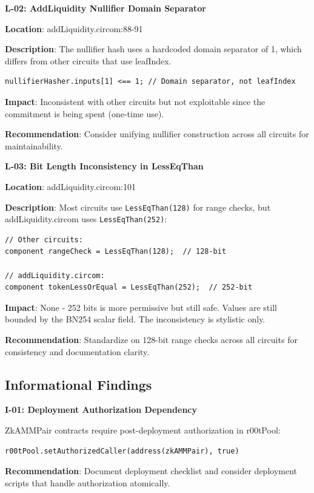 \documentclass[11pt,a4paper]{article}
\begin{document}
\begin{lowseverity}
\textbf{L-02: AddLiquidity Nullifier Domain Separator}

\textbf{Location}: addLiquidity.circom:88-91

\textbf{Description}: The nullifier hash uses a hardcoded domain separator of 1, which differs from other circuits that use leafIndex.

\begin{lstlisting}[style=circom]
nullifierHasher.inputs[1] <== 1; // Domain separator, not leafIndex
\end{lstlisting}

\textbf{Impact}: Inconsistent with other circuits but not exploitable since the commitment is being spent (one-time use).

\textbf{Recommendation}: Consider unifying nullifier construction across all circuits for maintainability.
\end{lowseverity}

\begin{lowseverity}
\textbf{L-03: Bit Length Inconsistency in LessEqThan}

\textbf{Location}: addLiquidity.circom:101

\textbf{Description}: Most circuits use \texttt{LessEqThan(128)} for range checks, but addLiquidity.circom uses \texttt{LessEqThan(252)}:

\begin{lstlisting}[style=circom]
// Other circuits:
component rangeCheck = LessEqThan(128);  // 128-bit

// addLiquidity.circom:
component tokenLessOrEqual = LessEqThan(252);  // 252-bit
\end{lstlisting}

\textbf{Impact}: None - 252 bits is more permissive but still safe. Values are still bounded by the BN254 scalar field. The inconsistency is stylistic only.

\textbf{Recommendation}: Standardize on 128-bit range checks across all circuits for consistency and documentation clarity.
\end{lowseverity}

\subsection{Informational Findings}

\begin{infobox}
\textbf{I-01: Deployment Authorization Dependency}

ZkAMMPair contracts require post-deployment authorization in r00tPool:
\begin{lstlisting}[style=solidity]
r00tPool.setAuthorizedCaller(address(zkAMMPair), true)
\end{lstlisting}

\textbf{Recommendation}: Document deployment checklist and consider deployment scripts that handle authorization atomically.
\end{infobox}
\end{document}
